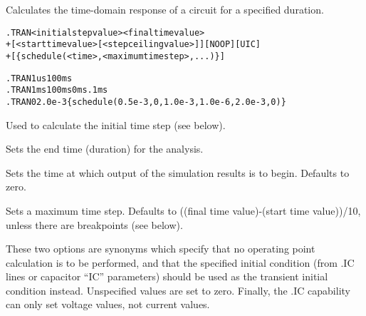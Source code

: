 


 
Calculates the time-domain response of a circuit for a specified duration.

\begin{Command}

\format
\begin{alltt}
.TRAN <initial step value> <final time value>
+ [<start time value> [<step ceiling value>]] [NOOP] [UIC]
+ [\{schedule( <time>, <maximum time step>, ... )\}]
\end{alltt}

\examples
\begin{alltt}
.TRAN 1us 100ms
.TRAN 1ms 100ms 0ms .1ms
.TRAN 0 2.0e-3  \{schedule( 0.5e-3, 0, 1.0e-3, 1.0e-6, 2.0e-3, 0 )\}
\end{alltt}

\arguments

\begin{Arguments}


Used to calculate the initial time step (see below).


Sets the end time (duration) for the analysis.


Sets the time at which output of the simulation results is to begin.  Defaults to zero.


Sets a maximum time step.  Defaults to ((final time value)-(start time
value))/10, unless there are breakpoints (see below).


These two options are synonyms which specify that no operating point
calculation is to be performed, and that the specified initial
condition (from .IC lines or capacitor ``IC'' parameters) should be
used as the transient initial condition instead. Unspecified values
are set to zero.  Finally, the .IC capability can only set voltage
values, not current values.


\end{Arguments}
\end{Command}
